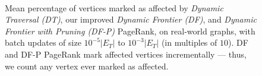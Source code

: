 \begin{figure}[!hbt]
  \centering
   \\[-2ex]
  \caption{Mean percentage of vertices marked as affected by \textit{Dynamic Traversal (DT)}, our improved \textit{Dynamic Frontier (DF)}, and \textit{Dynamic Frontier with Pruning (DF-P)} PageRank, on real-world graphs, with batch updates of size $10^{-5}|E_T|$ to $10^{-3}|E_T|$ (in multiples of $10$). DF and DF-P PageRank mark affected vertices incrementally --- thus, we count any vertex ever marked as affected.}
  \label{fig:measure-affected}
\end{figure}
